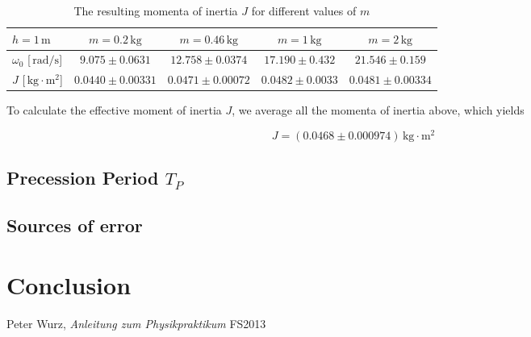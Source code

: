 \documentclass{scrreprt}
\newcommand{\unit}[1]{\ensuremath{\, \mathrm{#1}}}
\begin{document}
\begin{table}[H]
\centering
\begin{tabular}{|l|cccc|}
\hline
$h = 1\unit{m}$ & $ m = 0.2 \unit{kg}$ & $m = 0.46 \unit{kg}$ & $m = 1 \unit{kg}$ & $m = 2 \unit{kg}$\\
\hline\hline
$\omega_0$ [$\unit{rad/s}$] & $9.075 \pm 0.0631$ & $12.758 \pm 0.0374$ & $17.190 \pm 0.432$ & $21.546 \pm 0.159$\\ \hline
$J$ [$\unit{kg\cdot m^2}$] & $0.0440 \pm 0.00331$  & $0.0471 \pm 0.00072$ & $0.0482 \pm 0.0033$ & $0.0481 \pm 0.00334$ \\ \hline
\end{tabular}
\label{tab:inertia_results}
\caption{The resulting momenta of inertia $J$ for different values of $m$}
\end{table}

To calculate the effective moment of inertia $J$, we average all the momenta of inertia above, which yields

\begin{equation}
J = (0.0468	 \pm 0.000974) \unit{kg\cdot m^2}
\end{equation}

\subsection{Precession Period $T_P$}
\subsection{Sources of error}

\section{Conclusion}

\begin{thebibliography}{9}

  Peter Wurz,
  \emph{Anleitung zum Physikpraktikum}
  FS2013

\end{thebibliography}
\end{document}
